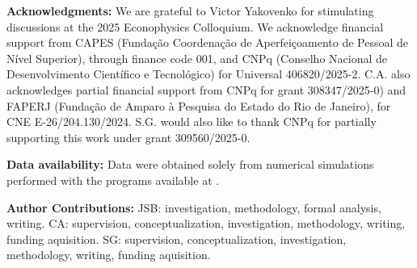 \documentclass[12pt,preprint]{revtex4-1}
\begin{document}
{\bf Acknowledgments:}
We are grateful to Victor Yakovenko for stimulating discussions at the 2025 Econophysics Colloquium. 
We acknowledge financial support from CAPES (Fundação Coordenação de Aperfeiçoamento de Pessoal de Nível Superior), through finance code 001, 
and CNPq (Conselho Nacional de Desenvolvimento Científico e Tecnológico) for Universal 406820/2025-2. 
C.A. also acknowledges partial financial support from CNPq for grant 308347/2025-0) and FAPERJ (Fundação de Amparo à Pesquisa do Estado do Rio de Janeiro), for CNE E-26/204.130/2024. S.G. would also like to thank CNPq for partially supporting this work under grant 309560/2025-0.

{\bf Data availability:}
Data were obtained solely from numerical simulations performed with the programs available at \cite{code}.

{\bf Author Contributions:}
JSB: investigation, methodology, formal analysis, writing.
CA:  supervision, conceptualization,  investigation, methodology, writing, funding aquisition.
SG:  supervision, conceptualization,  investigation, methodology, writing, funding aquisition.

%


\end{document}

